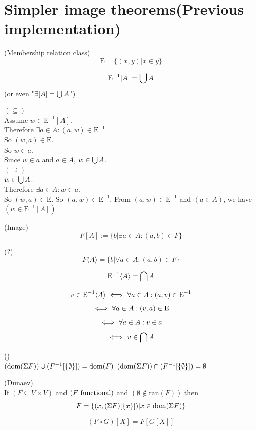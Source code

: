 \def\topic{}


\section{Simpler image theorems(Previous implementation)}


\begin{definition}(Membership relation class)
\[
\mbox{E} = \{(x,y)|x\in y\}
\]
\end{definition}



\begin{theorem}
\[
\mbox{E}^{-1}[A]=\bigcup A
\]
(or even "$\exists [A]= \bigcup A$")
\end{theorem}
\Proof
$(\subseteq)$\\
Assume $w\in \mbox{E}^{-1}[A]$.\\
Therefore $\exists a\in A: (a,w)\in \mbox{E}^{-1}$.\\
So $(w,a)\in \mbox{E}$.\\
So $w\in a$.\\
Since $w\in a$ and $a\in A$, $w\in \bigcup A$.\\
$(\supseteq)$\\
$w\in \bigcup A$.\\
Therefore $\exists a\in A: w\in a$.\\
So $(w,a)\in \mbox{E}$.
So $(a,w)\in \mbox{E}^{-1}$.
From $(a,w)\in \mbox{E}^{-1}$ and $(a\in A)$, we have $(w\in \mbox{E}^{-1}[A])$.\\
\Done

\begin{definition}(Image)
\[
F[A]:=\{b|\exists a\in A: (a,b)\in F\}
\]
\end{definition}
\begin{definition}(?)
\[
F\langle A \rangle=\{b|\forall a\in A: (a,b)\in F\}
\]
\end{definition}
\begin{theorem}
\[
\mbox{E}^{-1}\langle A\rangle =\bigcap A
\]
\end{theorem}
\Proof
\[
v\in \mbox{E}^{-1}\langle A \rangle 
\ \Longleftrightarrow\ 
\forall a\in A: (a,v)\in \mbox{E}^{-1}
\]
\[
\ \Longleftrightarrow\ 
\forall a\in A: (v,a)\in \mbox{E}
\]
\[
\ \Longleftrightarrow\ 
\forall a\in A: v \in a
\]
\[
\ \Longleftrightarrow\ 
v \in \bigcap A
\]

\Done
\begin{theorem}()\\
$(\mathrm{dom}(\Sigma F))\cup (F^{-1}[\{\emptyset\}]) = \mathrm{dom}(F)$
$\\
(\mathrm{dom}(\Sigma F))\cap (F^{-1}[\{\emptyset\}]) = \emptyset
$
\end{theorem}
\Proof
\Done

\begin{theorem}(Dunaev)\\
If $(F\subseteq V\times V)$ and $(F \mathrm{\ functional})$ and $(\emptyset\notin\mbox{ran}(F))$ then
\[
F=\{(x,(\Sigma F)[\{x\}])|x\in \mathrm{dom}(\Sigma F)\}
\]
\end{theorem}
\Proof
\Done


\begin{theorem}
\[
(F \circ G)[X]=F[G[X]]
\]
\end{theorem}
\Proof
\Done

